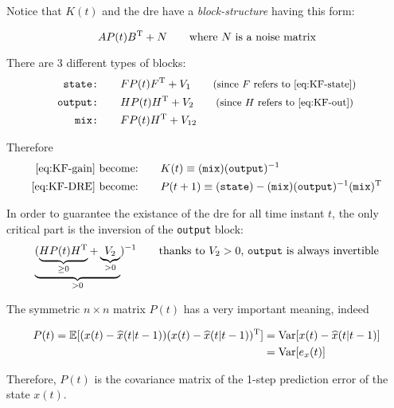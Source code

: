 \begin{remark}
    Notice that $K(t)$ and the \gls{dre} have  a \emph{block-structure} having this form: 
    
    \[ AP(t)B^{\mathrm{T}}+N  \qquad \text{where $N$ is a noise matrix}\]

    There are 3 different types of blocks:
    \begin{align*}
        \texttt{state:} \qquad& FP(t)F^{\mathrm{T}}+V_1 \qquad\text{\small{(since $F$ refers to \ref{eq:KF-state})}}\\
        \texttt{output:} \qquad& HP(t)H^{\mathrm{T}}+V_2 \qquad\text{\small{(since $H$ refers to \ref{eq:KF-out})}}\\
        \texttt{mix:} \qquad& FP(t)H^{\mathrm{T}}+V_{12}
    \end{align*}

    Therefore
    \begin{align*}
        \text{\ref{eq:KF-gain} become:} \qquad& K(t) \equiv (\texttt{mix})(\texttt{output})^{-1} \\
        \text{\ref{eq:KF-DRE} become:} \qquad& P(t+1) \equiv (\texttt{state}) - (\texttt{mix})(\texttt{output})^{-1}(\texttt{mix})^{\mathrm{T}}
    \end{align*}
\end{remark}


\begin{remark}
    In order to guarantee the existance of the \gls{dre} for all time instant $t$, the only critical part is the inversion of the \texttt{output} block:
    \[
        \underbrace{(\underbrace{HP(t)H^{\mathrm{T}}}_{\ge 0} + \underbrace{V_2}_{>0}}_{>0})^{-1} \qquad \text{thanks to $V_2>0$,  \texttt{output} is always invertible}
    \]
\end{remark}

\begin{remark}[Meaning of $P(t)$]
    The symmetric $n \times n$ matrix $P(t)$ has a very important meaning, indeed

    \begin{align*}
        P(t) = \mathbb{E}[(x(t) - \widehat{x}(t|t-1))(x(t) - \widehat{x}(t|t-1))^{\mathrm{T}}] 
        &= \text{Var}[x(t) - \widehat{x}(t|t-1)] \\
        &= \text{Var}[e_x(t)]     
    \end{align*}

    Therefore, $P(t)$ is the covariance matrix of the 1-step prediction error of the state $x(t)$.
\end{remark}


